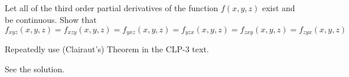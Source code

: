


\subsection*{\Conceptual}


\begin{question}
Let all of the third order partial derivatives of the function 
$f(x,y,z)$ exist and be continuous. Show that
\begin{equation*}
f_{xyz}(x,y,z)
=f_{xzy}(x,y,z)
=f_{yxz}(x,y,z)
=f_{yzx}(x,y,z)
=f_{zxy}(x,y,z)
=f_{zyx}(x,y,z)
\end{equation*}
\end{question}

\begin{hint}
Repeatedly use (Clairaut's) Theorem 
in the CLP-3 text. 
\end{hint}

\begin{answer}
See the solution.
\end{answer}

